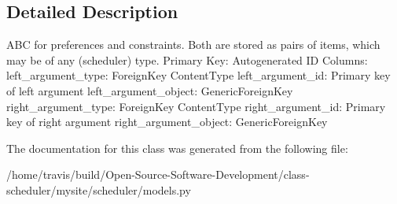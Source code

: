 \subsection{Detailed Description}
\begin{DoxyVerb}    ABC for preferences and constraints. Both are stored as pairs
    of items, which may be of any (scheduler) type.
    Primary Key: Autogenerated ID
    Columns:
        left_argument_type: ForeignKey ContentType
        left_argument_id: Primary key of left argument
        left_argument_object: GenericForeignKey
        right_argument_type: ForeignKey ContentType
        right_argument_id: Primary key of right argument
        right_argument_object: GenericForeignKey
\end{DoxyVerb}
 

The documentation for this class was generated from the following file\-:\begin{DoxyCompactItemize}
\item 
/home/travis/build/\-Open-\/\-Source-\/\-Software-\/\-Development/class-\/scheduler/mysite/scheduler/models.\-py\end{DoxyCompactItemize}
